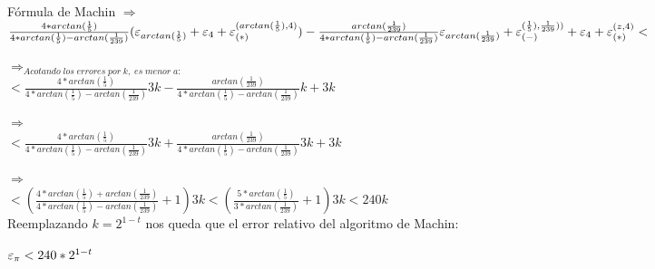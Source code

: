 \begin{subsection}{Fórmula de Machin}
	$\Rightarrow$\\
	
	$\frac{4*arctan(\frac{1}{5})}{4*arctan(\frac{1}{5})-arctan(\frac{1}{239})}(\varepsilon _{arctan(\frac{1}{5})}+\varepsilon _{4}+\varepsilon _{({*})}^{({arctan(\frac{1}{5}),4})}) - \frac{arctan(\frac{1}{239})}{4*arctan(\frac{1}{5})-arctan(\frac{1}{239})}\varepsilon _{arctan(\frac{1}{239})} + \varepsilon _{({-})}^{({\frac{1}{5}),\frac{1}{239})})} + \varepsilon _{4} + \varepsilon _{({*})}^{({z,4})} < $
	
	$\Rightarrow_{Acotando \; los \; errores \; por \; k, \; es \; menor \; a:}$\\
	
	$< \frac{4*arctan(\frac{1}{5})}{4*arctan(\frac{1}{5})-arctan(\frac{1}{239})}3k - \frac{arctan(\frac{1}{239})}{4*arctan(\frac{1}{5})-arctan(\frac{1}{239})}k+3k $
	
	$\Rightarrow$\\
	
	$< \frac{4*arctan(\frac{1}{5})}{4*arctan(\frac{1}{5})-arctan(\frac{1}{239})}3k + \frac{arctan(\frac{1}{239})}{4*arctan(\frac{1}{5})-arctan(\frac{1}{239})}3k+3k $
	
	$\Rightarrow$\\
	
	$< (\frac{4*arctan(\frac{1}{5})+arctan(\frac{1}{239})}{4*arctan(\frac{1}{5})-arctan(\frac{1}{239})} + 1) 3k <  (\frac{5*arctan(\frac{1}{5})}{3*arctan(\frac{1}{239})} + 1)3k < 240k$\\
		
	Reemplazando $k=2^{1-t}$ nos queda que el error relativo del algoritmo de Machin:
	
		$\varepsilon _{\pi} < 240*2^{1-t}$
	
	
\end{subsection}
